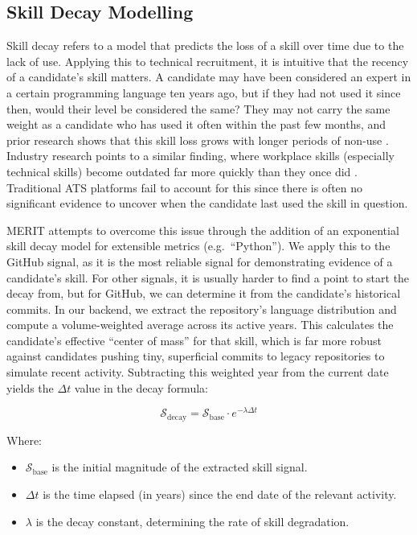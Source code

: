 \subsection{Skill Decay Modelling}
\label{subsec:skill-decay-modelling}
Skill decay refers to a model that predicts the loss of a skill over time due to the lack of use.
Applying this to technical recruitment, it is intuitive that the recency of a candidate's skill matters. A candidate may have been considered
an expert in a certain programming language ten years ago, but if they had not used it since then, would their level be considered the same?
They may not carry the same weight as a candidate who has used it often within the past few months, and prior research shows that this skill
loss grows with longer periods of non-use \cite{arthur1998}. Industry research points to a similar finding, where workplace skills (especially technical skills)
become outdated far more quickly than they once did \cite{ibm2019skillsgap,wef2020futurejobs}. Traditional ATS platforms fail to account for this since
there is often no significant evidence to uncover when the candidate last used the skill in question.

MERIT attempts to overcome this issue through the addition of an exponential skill decay model for extensible metrics (e.g.\ ``Python'').
We apply this to the GitHub signal, as it is the most reliable signal for demonstrating evidence of a candidate's skill.
For other signals, it is usually harder to find a point to start the decay from, but for GitHub, we can determine it from the candidate's historical commits.
In our backend, we extract the repository's language distribution and compute a volume-weighted average across its active years.
This calculates the candidate's effective ``center of mass'' for that skill, which is far more robust against candidates pushing tiny, 
superficial commits to legacy repositories to simulate recent activity. Subtracting this weighted year from the current
date yields the $\Delta t$ value in the decay formula:

\begin{equation} \label{eq:exponential_decay}
  \mathcal{S}_{\text{decay}} = \mathcal{S}_{\text{base}} \cdot e^{-\lambda \Delta t}
\end{equation}

Where:
\begin{itemize}
  \item $\mathcal{S}_{\text{base}}$ is the initial magnitude of the extracted skill signal.
  \item $\Delta t$ is the time elapsed (in years) since the end date of the relevant activity.
  \item $\lambda$ is the decay constant, determining the rate of skill degradation.
\end{itemize}

